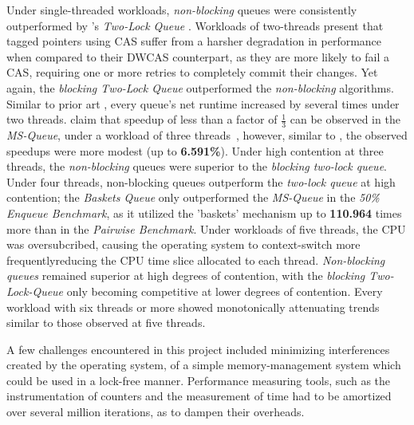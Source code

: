 Under single-threaded workloads, \emph{non-blocking} queues were consistently
outperformed by \citeauthor{michael1996simple}'s \emph{Two-Lock Queue}
\citep{michael1996simple}.
Workloads of two-threads present that tagged pointers using
CAS suffer from a harsher degradation in performance when compared to their
DWCAS counterpart, as they are more likely to fail a CAS, requiring one or more
retries to completely commit their changes. Yet again, the \emph{blocking
Two-Lock Queue} outperformed the \emph{non-blocking} algorithms. Similar to
prior art \citep{hoffman2007baskets,michael1996simple,ladan2008optimistic}, every
queue's net runtime increased by several times under two threads.
\citeauthor{michael1996simple} claim that speedup of less than a factor of
$\frac{1}{3}$ can be observed in the \emph{MS-Queue}, under a workload of three threads~\citep{michael1996simple},
however, similar to \citep{ladan2008optimistic,hoffman2007baskets}, the
observed speedups were more modest (up to \textbf{6.591\%}).
Under high contention at three threads, the \emph{non-blocking} queues were
superior to the \emph{blocking two-lock queue}. 
Under four threads, non-blocking queues outperform the \emph{two-lock queue} at
high contention; the \emph{Baskets Queue} only outperformed the \emph{MS-Queue}
in the \emph{50\% Enqueue Benchmark}, as it utilized the 'baskets' mechanism up
to \textbf{110.964} times more than in the \emph{Pairwise Benchmark}. Under
workloads of five threads, the CPU was oversubcribed, causing the operating
system to context-switch more frequently\textemdash reducing the CPU time slice
allocated to each thread. \emph{Non-blocking queues} remained superior at high
degrees of contention, with the \emph{blocking Two-Lock-Queue} only becoming
competitive at lower degrees of contention. Every workload with six threads or
more showed monotonically attenuating trends similar to those observed at five
threads.

A few challenges encountered in this project included minimizing interferences
created by the operating system, of a simple memory-management system which
could be used in a lock-free manner. Performance measuring tools, such as the
instrumentation of counters and the measurement of time had to be amortized
over several million iterations, as to dampen their overheads.